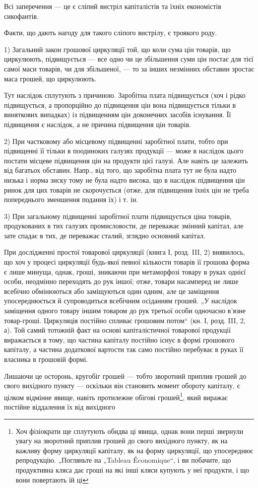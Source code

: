 Всі заперечення — це є сліпий вистріл капіталістів та їхніх економістів
сикофантів.

Факти, що дають нагоду для такого сліпого вистрілу, є троякого роду.

1) Загальний закон грошової циркуляції той, що коли сума цін товарів,
що циркулюють, підвищується — все одно чи це збільшення суми
цін постає для тієї самої маси товарів, чи для збільшеної, — то за інших
незмінних обставин зростає маса грошей, що циркулюють.

Тут наслідок сплутують з причиною. Заробітна плата підвищується (хоч
і рідко підвищується, а пропорційно до підвищення цін вона підвищується
тільки в виняткових випадках) із підвищенням цін доконечних засобів існування.
Її підвищення є наслідок, а не причина підвищення цін товарів.

2) При частковому або місцевому підвищенні заробітної плати, тобто
при підвищенні її тільки в поодиноких галузях продукції — може в наслідок
цього постати місцеве підвищення цін на продукти цієї галузі. Але навіть
це залежить від багатьох обставин. Напр., від того, що заробітна плата
тут не була надто низька і норма зиску тому не була надто висока, що
в наслідок підвищення цін ринок для цих товарів не скорочується
(отже, для підвищення їхніх цін не треба попереднього зменшення
подання їх) і т. ін.

3) При загальному підвищенні заробітної плати підвищується ціна товарів,
продукованих в тих галузях промисловости, де переважає змінний капітал,
але зате спадає в тих, де переважає сталий, зглядно основний капітал.

При дослідженні простої товарової циркуляції (книга І, розд. III, 2) виявилось,
що хоч у процесі циркуляції будь-якої певної кількости товарів її
грошова форма є лише минуща, однак, гроші, зникаючи при метаморфозі
товару в руках однієї особи, неодмінно переходять до рук іншої; отже,
товари насамперед не лише всебічно обмінюються або заміщуються один
одним, але це заміщення упосереднюється й супроводиться всебічним
осіданням грошей. „У наслідок заміщення одного товару іншим товаром
до рук третьої особи одночасно в’язне товар-гроші. Циркуляція постійно
спливає грошовим потом“ (кн. І, розд. III, 2, а). Той самий тотожній
факт на основі капіталістичної товарової продукції виражається в тому,
що частина капіталу постійно існує в формі грошового капіталу, а частина
додаткової вартости так само постійно перебуває в руках її власника
в грошовій формі.

Лишаючи це осторонь, кругобіг грошей — тобто зворотний приплив
грошей до свого вихідного пункту — оскільки він становить момент
обороту капіталу, є цілком відмінне явище, навіть протилежне обігові
грошей\footnote{
Хоч фізіократи ще сплутують обидва ці явища, однак вони перші звернули
увагу на зворотний приплив грошей до свого вихідного пункту, як на важливу
форму циркуляції капіталу, як на форму циркуляції, що упосереднює репродукцію.
„Погляньте на „Tableau Économique“, і ви побачите, що продуктивна кляса дає
гроші на які інші кляси купують у неї продукти, і що вони повертають їй ці
}, який виражає постійне віддалення їх від вихідного